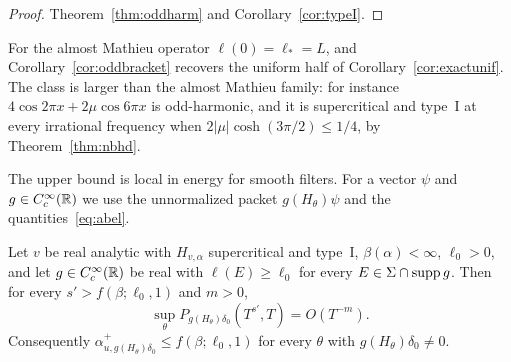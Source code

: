 \begin{proof}
Theorem~\ref{thm:oddharm} and Corollary~\ref{cor:typeI}.
\end{proof}

For the almost Mathieu operator $\ell(0)=\ell_*=L$, and Corollary~\ref{cor:oddbracket} recovers the uniform half of Corollary~\ref{cor:exactunif}. The class is larger than the almost Mathieu family: for instance $4\cos2\pi x+2\mu\cos6\pi x$ is odd-harmonic, and it is supercritical and type~I at every irrational frequency when $2|\mu|\cosh(3\pi/2)\le1/4$, by Theorem~\ref{thm:nbhd}.

The upper bound is local in energy for smooth filters. For a vector $\psi$ and $g\in C_c^\infty(\mathbb R)$ we use the unnormalized packet $g(H_\theta)\psi$ and the quantities~\eqref{eq:abel}.

\begin{corollary}\label{cor:filter}
Let $v$ be real analytic with $H_{v,\alpha}$ supercritical and type~I, $\beta(\alpha)<\infty$, $\ell_0>0$, and let $g\in C_c^\infty(\mathbb R)$ be real with $\ell(E)\ge\ell_0$ for every $E\in\Sigma\cap\operatorname{supp} g$. Then for every $s'>f(\beta;\ell_0,1)$ and $m>0$,
\[
\sup_\theta P_{g(H_\theta)\delta_0}(T^{s'},T)=O(T^{-m}).
\]
Consequently $\alpha^+_{u,g(H_\theta)\delta_0}\le f(\beta;\ell_0,1)$ for every $\theta$ with $g(H_\theta)\delta_0\ne0$.
\end{corollary}

